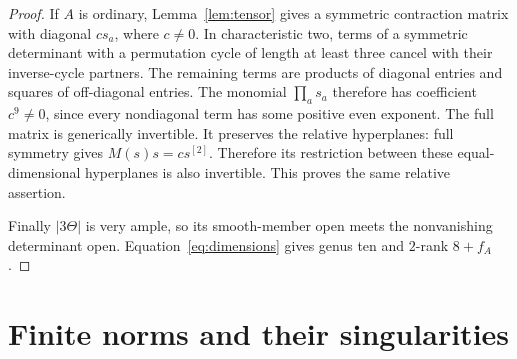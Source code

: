 \documentclass[11pt]{article}
\theoremstyle{definition}\newtheorem{definition}[theorem]{Definition}
\theoremstyle{remark}\newtheorem{remark}[theorem]{Remark}
\begin{document}
\begin{proof}
If $A$ is ordinary, Lemma~\ref{lem:tensor} gives a symmetric contraction matrix with diagonal $c s_a$, where $c\ne0$. In characteristic two, terms of a symmetric determinant with a permutation cycle of length at least three cancel with their inverse-cycle partners. The remaining terms are products of diagonal entries and squares of off-diagonal entries. The monomial $\prod_as_a$ therefore has coefficient $c^9\ne0$, since every nondiagonal term has some positive even exponent. The full matrix is generically invertible. It preserves the relative hyperplanes: full symmetry gives $M(s)s=c s^{[2]}$. Therefore its restriction between these equal-dimensional hyperplanes is also invertible. This proves the same relative assertion.

Finally $|3\Theta|$ is very ample, so its smooth-member open meets the nonvanishing determinant open. Equation~\eqref{eq:dimensions} gives genus ten and $2$-rank $8+f_A$.
\end{proof}

\section{Finite norms and their singularities}
\end{document}
